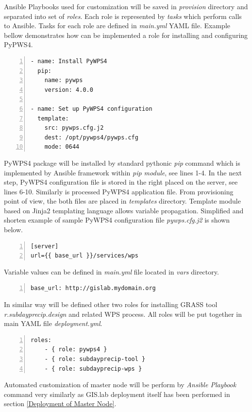 \documentclass{isprs}
\begin{document}
Ansible Playbooks used for customization will be saved in
\textit{provision} directory and separated into set of
\textit{roles}. Each role is represented by \textit{tasks} which
perform calls to Ansible. Tasks for each role are defined in
\textit{main.yml} YAML file. Example bellow demonstrates how can be
implemented a role for installing and configuring PyPWS4.

\begin{lstlisting}[numbers=left,xleftmargin=1em]
- name: Install PyWPS4
  pip:
    name: pywps
    version: 4.0.0

- name: Set up PyWPS4 configuration
  template:
    src: pywps.cfg.j2
    dest: /opt/pywps4/pywps.cfg
    mode: 0644
\end{lstlisting}

PyWPS4 package will be installed by standard pythonic \textit{pip}
command which is implemented by Ansible framework within \textit{pip
  module}, see lines 1-4. In the next step, PyWPS4 configuration file
is stored in the right placed on the server, see lines
6-10. Simi\-larly is processed PyWPS4 application file. From
provisioning point of view, the both files are placed in
\textit{templates} directory. Template module based on Jinja2
templating language allows variable propagation. Simplified and
shorten example of sample PyWPS4 configuration file
\textit{pywps.cfg.j2} is shown below.

\begin{lstlisting}[numbers=left,xleftmargin=1em]
[server]
url={{ base_url }}/services/wps
\end{lstlisting}

Variable values can be defined in \textit{main.yml} file located in
\textit{vars} directory.

\begin{lstlisting}[numbers=left,xleftmargin=1em]
base_url: http://gislab.mydomain.org
\end{lstlisting}

In similar way will be defined other two roles for installing GRASS
tool \textit{r.subdayprecip.design} and related WPS process. All roles
will be put together in main YAML file \textit{deployment.yml}.

\begin{lstlisting}[numbers=left,xleftmargin=1em]
roles:
    - { role: pywps4 }
    - { role: subdayprecip-tool }
    - { role: subdayprecip-wps }
\end{lstlisting}

Automated customization of master node will be perform by
\textit{Ansible Playbook} command very similarly as GIS.lab deployment
itself has been performed in section \ref{Deployment of Master Node}.
\end{document}
